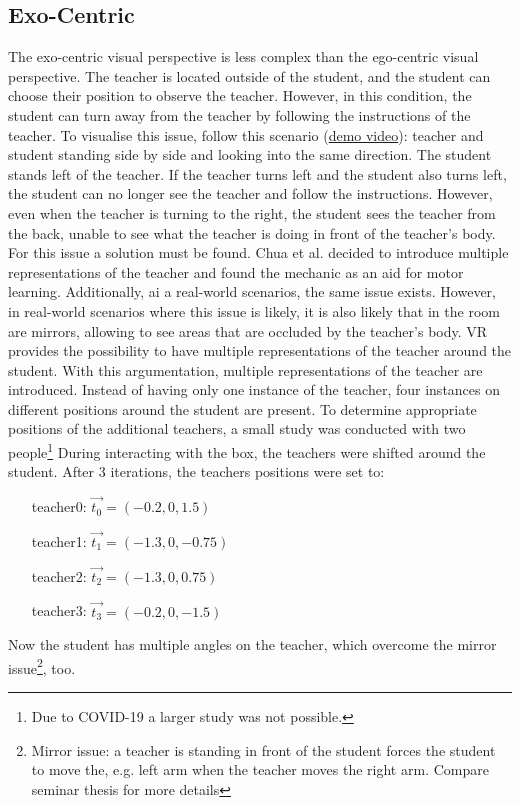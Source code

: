 \subsection{Exo-Centric}
The exo-centric visual perspective is less complex than the ego-centric visual perspective. The teacher is located outside of the student, and the student can choose their position to observe the teacher. However, in this condition, the student can turn away from the teacher by following the instructions of the teacher. To visualise this issue, follow this scenario (\href{https://www.youtube.com/watch?v=mRG22RBXKTM&feature=youtu.be}{demo video}): teacher and student standing side by side and looking into the same direction. The student stands left of the teacher. If the teacher turns left and the student also turns left, the student can no longer see the teacher and follow the instructions. However, even when the teacher is turning to the right, the student sees the teacher from the back, unable to see what the teacher is doing in front of the teacher's body. For this issue a solution must be found. Chua et al. \cite{Chua} decided to introduce multiple representations of the teacher and found the mechanic as an aid for motor learning. Additionally, ai a real-world scenarios, the same issue exists. However, in real-world scenarios where this issue is likely, it is also likely that in the room are mirrors, allowing to see areas that are occluded by the teacher's body.  VR provides the possibility to have multiple representations of the teacher around the student. With this argumentation, multiple representations of the teacher are introduced. Instead of having only one instance of the teacher, four instances on different positions around the student are present. To determine appropriate positions of the additional teachers, a small study was conducted with two people\footnote{Due to COVID-19 a larger study was not possible.} During interacting with the box, the teachers were shifted around the student. After 3 iterations, the teachers positions were set to:
\begin{itemize}
	\centering
	\item[teacher0:] $\vec{t_0} = (-0.2,0,1.5)$
	\item[teacher1:] $\vec{t_1} = (-1.3,0,-0.75)$
	\item[teacher2:] $\vec{t_2} = (-1.3,0,0.75)$
	\item[teacher3:] $\vec{t_3} = (-0.2,0,-1.5)$
\end{itemize}

Now the student has multiple angles on the teacher, which overcome the mirror issue\footnote{Mirror issue: a teacher is standing in front of the student forces the student to move the, e.g. left arm when the teacher moves the right arm. Compare seminar thesis for more details}, too.
